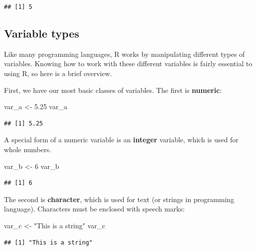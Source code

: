 \documentclass[
]{book}
\newenvironment{Shaded}{\begin{snugshade}}{\end{snugshade}}
\newcommand{\DecValTok}[1]{\textcolor[rgb]{0.00,0.00,0.81}{#1}}
\newcommand{\FloatTok}[1]{\textcolor[rgb]{0.00,0.00,0.81}{#1}}
\newcommand{\NormalTok}[1]{#1}
\newcommand{\OtherTok}[1]{\textcolor[rgb]{0.56,0.35,0.01}{#1}}
\newcommand{\StringTok}[1]{\textcolor[rgb]{0.31,0.60,0.02}{#1}}
\begin{document}
\begin{verbatim}
## [1] 5
\end{verbatim}

\subsection{Variable types}\label{variable-types}

Like many programming languages, R works by manipulating different types of variables. Knowing how to work with these different variables is fairly essential to using R, so here is a brief overview.

First, we have our most basic classes of variables. The first is \textbf{numeric}:

\begin{Shaded}
\begin{Highlighting}[]
\NormalTok{var\_a }\OtherTok{\textless{}{-}} \FloatTok{5.25}
\NormalTok{var\_a}
\end{Highlighting}
\end{Shaded}

\begin{verbatim}
## [1] 5.25
\end{verbatim}

A special form of a numeric variable is an \textbf{integer} variable, which is used for whole numbers.

\begin{Shaded}
\begin{Highlighting}[]
\NormalTok{var\_b }\OtherTok{\textless{}{-}} \DecValTok{6}
\NormalTok{var\_b}
\end{Highlighting}
\end{Shaded}

\begin{verbatim}
## [1] 6
\end{verbatim}

The second is \textbf{character}, which is used for text (or strings in programming language). Characters must be enclosed with speech marks:

\begin{Shaded}
\begin{Highlighting}[]
\NormalTok{var\_c }\OtherTok{\textless{}{-}} \StringTok{"This is a string"}
\NormalTok{var\_c}
\end{Highlighting}
\end{Shaded}

\begin{verbatim}
## [1] "This is a string"
\end{verbatim}
\end{document}
